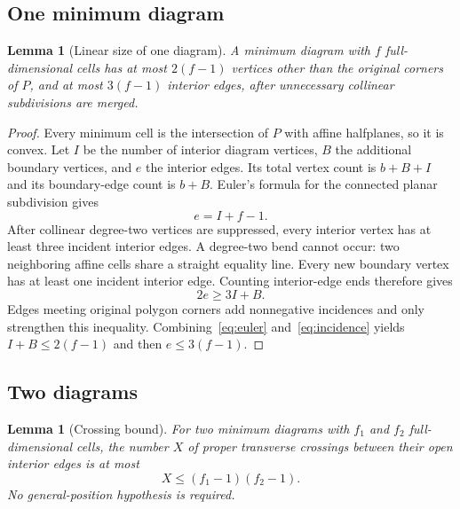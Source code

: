 \documentclass[11pt,letterpaper]{article}
\newtheorem{lemma}[theorem]{Lemma}
\theoremstyle{definition}
\theoremstyle{remark}\newtheorem{remark}[theorem]{Remark}
\begin{document}
\subsection{One minimum diagram}

\begin{lemma}[Linear size of one diagram]
\label{lem:one}
A minimum diagram with $f$ full-dimensional cells has at most $2(f-1)$
vertices other than the original corners of $P$, and at most $3(f-1)$
interior edges, after unnecessary collinear subdivisions are merged.
\end{lemma}

\begin{proof}
Every minimum cell is the intersection of $P$ with affine halfplanes,
so it is convex. Let $I$ be the number of interior diagram vertices,
$B$ the additional boundary vertices, and $e$ the interior edges. Its total
vertex count is $b+B+I$ and its boundary-edge count is $b+B$.
Euler's formula for the connected planar subdivision gives
\begin{equation}
 e=I+f-1.
 \label{eq:euler}
\end{equation}
After collinear degree-two vertices are suppressed, every interior vertex
has at least three incident interior edges. A degree-two bend cannot occur:
two neighboring affine cells share a straight equality line. Every new
boundary vertex has at least one incident interior edge. Counting
interior-edge ends therefore gives
\begin{equation}
 2e\ge3I+B.
 \label{eq:incidence}
\end{equation}
Edges meeting original polygon corners add nonnegative incidences and
only strengthen this inequality. Combining~\eqref{eq:euler}
and~\eqref{eq:incidence} yields $I+B\le2(f-1)$ and then
$e\le3(f-1)$.
\end{proof}

\subsection{Two diagrams}

\begin{lemma}[Crossing bound]
\label{lem:crossings}
For two minimum diagrams with $f_1$ and $f_2$ full-dimensional cells,
the number $X$ of proper transverse crossings between their open interior
edges is at most
\[
 X\le(f_1-1)(f_2-1).
\]
No general-position hypothesis is required.
\end{lemma}
\end{document}
